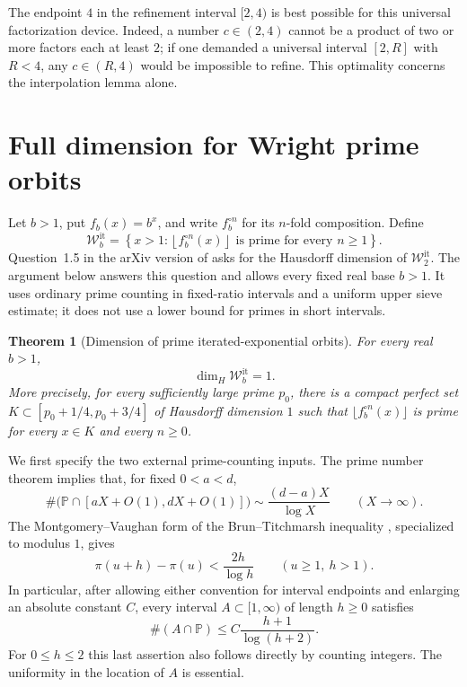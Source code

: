 \documentclass[11pt,a4paper]{article}
\newtheorem{theorem}{Theorem}[section]
\theoremstyle{definition}
\theoremstyle{remark}
\numberwithin{equation}{section}
\begin{document}
The endpoint $4$ in the refinement interval $[2,4)$ is best possible for
this universal factorization device. Indeed, a number $c\in(2,4)$ cannot
be a product of two or more factors each at least $2$; if one demanded a
universal interval $[2,R]$ with $R<4$, any $c\in(R,4)$ would be impossible
to refine. This optimality concerns the interpolation lemma alone.



\section{Full dimension for Wright prime orbits}
\label{fol:sec:wright-dimension-extension}

Let $b>1$, put $f_b(x)=b^x$, and write $f_b^{\circ n}$ for its
$n$-fold composition. Define
\[
 \mathcal W_b^{\mathrm{it}}
 =\left\{x>1:
   \left\lfloor f_b^{\circ n}(x)\right\rfloor\text{ is prime
   for every }n\ge1\right\}.
\]
Question~1.5 in the arXiv version of
\cite{SaitoDimension2021} asks for the Hausdorff dimension of
$\mathcal W_2^{\mathrm{it}}$. The argument below answers this question
and allows every fixed real base $b>1$. It uses ordinary prime counting in fixed-ratio intervals and a uniform upper sieve estimate; it does not
use a lower bound for primes in short intervals.
\begin{theorem}[Dimension of prime iterated-exponential orbits]
\label{fol:thm:wright-full-dimension}
For every real $b>1$,
\[
 \boxed{\dim_H\mathcal W_b^{\mathrm{it}}=1.}
\]
More precisely, for every sufficiently large prime $p_0$, there is a compact perfect set $K\subset[p_0+1/4,p_0+3/4]$ of Hausdorff dimension
$1$ such that $\lfloor f_b^{\circ n}(x)\rfloor$ is prime for every
$x\in K$ and every $n\ge0$.
\end{theorem}
We first specify the two external prime-counting inputs. The prime number theorem implies that, for fixed $0<a<d$,
\begin{equation}\label{fol:eq:wright-pnt-input}
 \#\bigl(\mathbb P\cap[aX+O(1),dX+O(1)]\bigr)
 \sim\frac{(d-a)X}{\log X}\qquad(X\longrightarrow\infty).
\end{equation}
The Montgomery--Vaughan form of the Brun--Titchmarsh inequality
\cite[Theorem~2]{MontgomeryVaughan1973}, specialized to modulus $1$,
gives
\[
 \pi(u+h)-\pi(u)<\frac{2h}{\log h}
 \qquad(u\ge1,\ h>1).
\]
In particular, after allowing either convention for interval endpoints and enlarging an absolute constant $C$, every interval $A\subset[1,\infty)$ of length $h\ge0$ satisfies
\begin{equation}\label{fol:eq:wright-sieve-input}
 \#(A\cap\mathbb P)\le C\frac{h+1}{\log(h+2)}.
\end{equation}
For $0\le h\le2$ this last assertion also follows directly by counting integers. The uniformity in the location of $A$ is essential.
\end{document}
